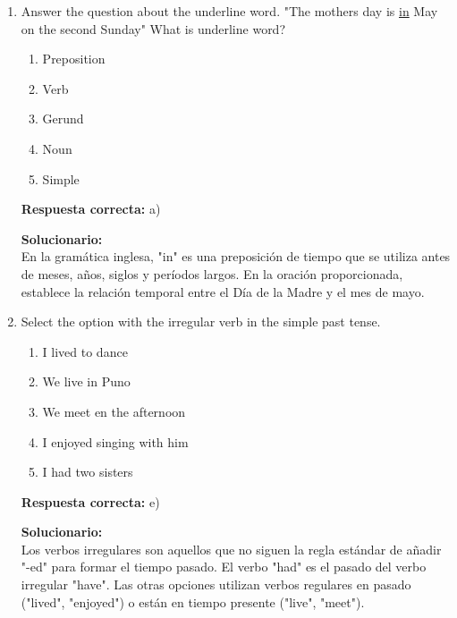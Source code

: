 \begin{enumerate}

	\item Answer the question about the underline word.
	"The mothers day is \underline{in} May on the second Sunday"
	What is underline word?
	
	\begin{enumerate}[label=\alph*)]
		\item Preposition
		\item Verb
		\item Gerund
		\item Noun
		\item Simple
	\end{enumerate}
	
	\textbf{Respuesta correcta:} a)
	
	\vspace{2mm}
	\textbf{Solucionario:}\\
	En la gramática inglesa, "in" es una preposición de tiempo que se utiliza antes de meses, años, siglos y períodos largos. En la oración proporcionada, establece la relación temporal entre el Día de la Madre y el mes de mayo.
	
	\vspace{6mm}
	
	\item Select the option with the irregular verb in the simple past tense.
	
	\begin{enumerate}[label=\alph*)]
		\item I lived to dance
		\item We live in Puno
		\item We meet en the afternoon
		\item I enjoyed singing with him
		\item I had two sisters
	\end{enumerate}
	
	\textbf{Respuesta correcta:} e)
	
	\vspace{2mm}
	\textbf{Solucionario:}\\
	Los verbos irregulares son aquellos que no siguen la regla estándar de añadir "-ed" para formar el tiempo pasado. El verbo "had" es el pasado del verbo irregular "have". Las otras opciones utilizan verbos regulares en pasado ("lived", "enjoyed") o están en tiempo presente ("live", "meet").
	
	\vspace{6mm}
	
\end{enumerate}





